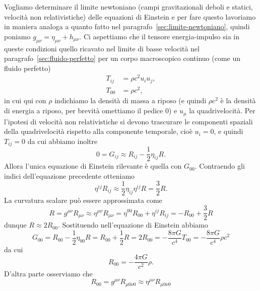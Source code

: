 Vogliamo determinare il limite newtoniano (campi gravitazionali deboli e
statici, velocità non relativistiche) delle equazioni di Einstein e per fare
questo lavoriamo in maniera analoga a quanto fatto nel
paragrafo~\ref{sec:limite-newtoniano}, quindi poniamo
$g_{\mu\nu} = \eta_{\mu\nu} + h_{\mu\nu}$.  Ci aspettiamo che il tensore
energia-impulso sia in queste condizioni quello ricavato nel limite di basse
velocità nel paragrafo~\ref{sec:fluido-perfetto} per un corpo macroscopico
continuo (come un fluido perfetto)
\begin{subequations}
  \begin{align}
    T_{ij} &= \rho c^{2} u_{i} u_{j}, \\
    T_{00} &= \rho c^{2},
  \end{align}
\end{subequations}
in cui qui con $\rho$ indichiamo la densità di massa a riposo (e quindi
$\rho c^{2}$ è la densità di energia a riposo, per brevità omettiamo il pedice
$0$) e $u_{\mu}$ la quadrivelocità.  Per l'ipotesi di velocità non
relativistiche si devono trascurare le componenti spaziali della quadrivelocità
rispetto alla componente temporale, cioè $u_{i} = 0$, e quindi $T_{ij} = 0$ da
cui abbiamo inoltre
\begin{equation}
  0 = G_{ij} \approx R_{ij} - \frac{1}{2}\eta_{ij}R.
\end{equation}
Allora l'unica equazione di Einstein rilevante è quella con $G_{00}$.
Contraendo gli indici dell'equazione precedente otteniamo
\begin{equation}
  \eta^{ij}R_{ij} \approx \frac{1}{2} \eta_{ij}\eta^{ij} R = \frac{3}{2} R.
\end{equation}
La curvatura scalare può essere approssimata come
\begin{equation}
  R = g^{\mu\nu}R_{\mu\nu} \approx \eta^{\mu\nu} R_{\mu\nu} = \eta^{00}R_{00} +
  \eta^{ij}R_{ij} = -R_{00} + \frac{3}{2} R
\end{equation}
dunque $R \approx 2 R_{00}$.  Sostituendo nell'equazione di Einstein abbiamo
\begin{equation}
  G_{00} = R_{00} - \frac{1}{2} \eta_{00}R = R_{00} + \frac{1}{2} R = 2 R_{00} =
  -\frac{8\pi G}{c^{4}} T_{00} = -\frac{8\pi G}{c^{4}} \rho c^{2}
\end{equation}
da cui
\begin{equation}
  R_{00} = -\frac{4\pi G}{c^{2}} \rho.
\end{equation}
D'altra parte osserviamo che
\begin{equation}
  R_{00} = g^{\mu\nu}R_{\mu 0\nu 0} \approx \eta^{\mu\nu}R_{\mu 0\nu 0}
\end{equation}
